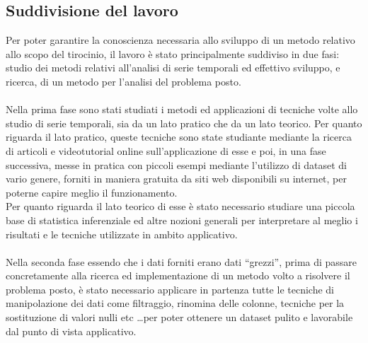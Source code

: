 \subsection{Suddivisione del lavoro}
Per poter garantire la conoscienza necessaria allo sviluppo di un metodo relativo allo scopo
del tirocinio, il lavoro è stato principalmente suddiviso in due fasi: studio dei metodi
relativi all'analisi di serie temporali ed effettivo sviluppo, e ricerca, di un metodo per l'analisi
del problema posto.\\
\\
Nella prima fase sono stati studiati i metodi ed applicazioni di tecniche volte allo studio
di serie temporali, sia da un lato pratico che da un lato teorico. Per quanto riguarda il lato 
pratico, queste tecniche sono state studiante mediante la ricerca di articoli e videotutorial online
sull'applicazione di esse e poi, in una fase successiva, messe in pratica con piccoli esempi 
mediante l'utilizzo di dataset di vario genere, forniti in maniera gratuita da siti web disponibili 
su internet, per poterne capire meglio il funzionamento.\\
Per quanto riguarda il lato teorico di esse è stato necessario studiare una piccola base di statistica
inferenziale ed altre nozioni generali per interpretare al meglio i risultati e le tecniche utilizzate in 
ambito applicativo.\\
\\
Nella seconda fase essendo che i dati forniti erano dati ``grezzi'', prima di passare concretamente 
alla ricerca ed implementazione di un metodo volto a risolvere il problema posto, è stato 
necessario applicare in partenza tutte le tecniche di manipolazione dei dati come filtraggio, 
rinomina delle colonne, tecniche per la sostituzione di valori nulli etc \dots per poter 
ottenere un dataset pulito e lavorabile dal punto di vista applicativo.
